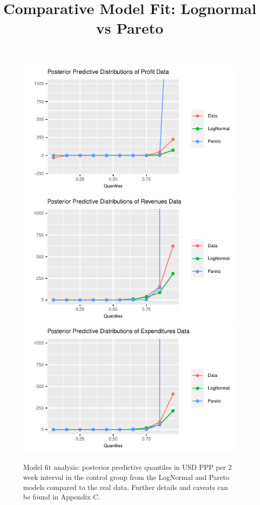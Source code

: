 \documentclass[AER]{AEA}
\begin{document}
 
  \begin{figure}[h!]
  \centering
  \title{Comparative Model Fit: Lognormal vs Pareto}
    \includegraphics{posterior_predictive_profit.pdf}\\
    \includegraphics{posterior_predictive_revenues.pdf}\\
          \includegraphics{posterior_predictive_expenditures.pdf}

  \caption{Model fit analysis: posterior predictive quantiles in USD PPP per 2 week interval in the control group from the LogNormal and Pareto models compared to the real data. Further details and caveats can be found in Appendix C. }\label{model fit}
\end{figure}
\end{document}
